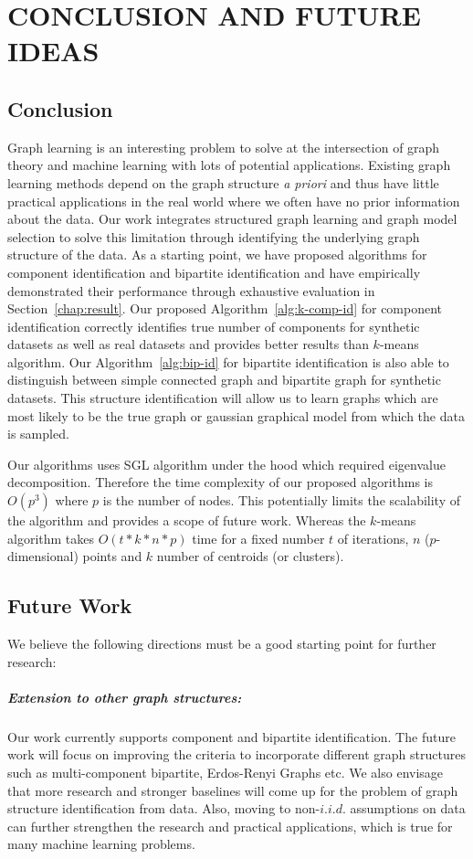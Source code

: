 \chapter{CONCLUSION AND FUTURE IDEAS}
\label{chap:conc}

\section{Conclusion}
Graph learning is an interesting problem to solve at the intersection of graph theory and machine learning with lots of potential applications. Existing graph learning methods depend on the graph structure \textit{a priori} and thus have little practical applications in the real world where we often have no prior information about the data. Our work integrates structured graph learning and graph model selection to solve this limitation through identifying the underlying graph structure of the data. As a starting point, we have proposed algorithms for component identification and bipartite identification and have empirically demonstrated their performance through exhaustive evaluation in Section~\ref{chap:result}. Our proposed Algorithm~\ref{alg:k-comp-id}  for component identification correctly identifies true number of components for synthetic datasets as well as real datasets and provides better results than $k$-means algorithm. Our Algorithm~\ref{alg:bip-id} for bipartite identification is also able to distinguish between simple connected graph and bipartite graph for synthetic datasets. This structure identification will allow us to learn graphs which are most likely to be the true graph or gaussian graphical model from which the data is sampled.

Our algorithms uses SGL algorithm under the hood which required eigenvalue decomposition. Therefore the time complexity of our proposed algorithms is $O(p^3)$ where $p$ is the number of nodes. This potentially limits the scalability of the algorithm and provides a scope of future work. Whereas the $k$-means algorithm takes $O(t*k*n*p)$ time for a fixed number $t$ of iterations, $n$ ($p$-dimensional) points and $k$ number of centroids (or clusters).

\section{Future Work}
We believe the following directions must be a good starting point for further research:

\paragraph{Extension to other graph structures:} Our work currently supports component and bipartite identification. The future work will focus on improving the criteria  to incorporate different graph structures such as multi-component bipartite, Erdos-Renyi Graphs etc. We also envisage that more research and stronger baselines will come up for the problem of graph structure identification from data. Also, moving to non-$i.i.d.$ assumptions on data can further strengthen the research and practical applications, which is true for many machine learning problems.
		
